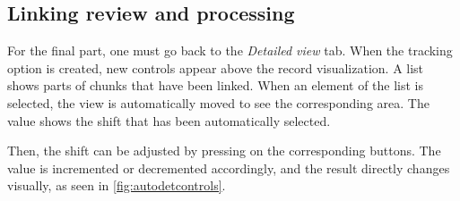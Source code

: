 \subsection{Linking review and processing}
\label{sec:linkreview}

For the final part, one must go back to the \emph{Detailed view} tab. When the tracking option is created, new controls appear above the record visualization. A list shows parts of chunks that have been linked. When an element of the list is selected, the view is automatically moved to see the corresponding area. The value shows the shift that has been automatically selected.

Then, the shift can be adjusted by pressing on the corresponding buttons. The value is incremented or decremented accordingly, and the result directly changes visually, as seen in \autoref{fig:autodetcontrols}.

